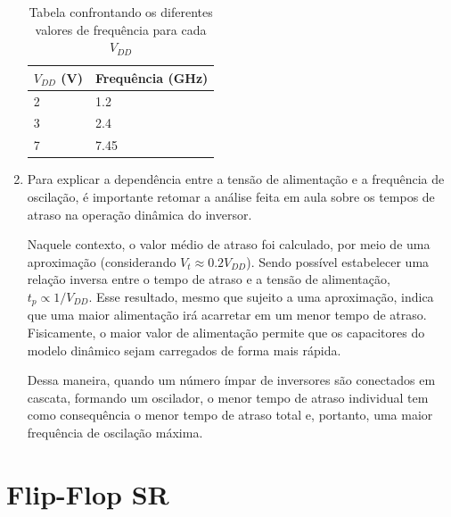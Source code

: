 \documentclass[11pt]{article}
\begin{document}
\begin{enumerate}[label=\alph*)]
\begin{table}[H]
    \centering
    \caption{Tabela confrontando os diferentes valores de frequência para cada $V_{DD}$}
    \begin{tabularx}{.4\textwidth}{XX} \toprule
        {$V_{DD}$ (V)} & {Frequência (GHz)} \\ \midrule
        {2} & {1.2} \\[1cm]
        {3} & {2.4} \\[1cm]
        {7} & {7.45}
    \end{tabularx}
    \label{tab:espectro}
\end{table}

\item Para explicar a dependência entre a tensão de alimentação e a frequência de oscilação, é importante retomar a análise feita em aula sobre os tempos de atraso na operação dinâmica do inversor.

Naquele contexto, o valor médio de atraso foi calculado, por meio de uma aproximação (considerando $V_t\approx0.2 V_{DD}$). Sendo possível estabelecer uma relação inversa entre o tempo de atraso e a tensão de alimentação, $t_p \propto 1/V_{DD}$. Esse resultado, mesmo que sujeito a uma aproximação, indica que uma maior alimentação irá acarretar em um menor tempo de atraso. Fisicamente, o maior valor de alimentação permite que os capacitores do modelo dinâmico sejam carregados de forma mais rápida.

Dessa maneira, quando um número ímpar de inversores são conectados em cascata, formando um oscilador, o menor tempo de atraso individual tem como consequência o menor tempo de atraso total e, portanto, uma maior frequência de oscilação máxima.

\end{enumerate}

\section{Flip-Flop SR}
\end{document}
